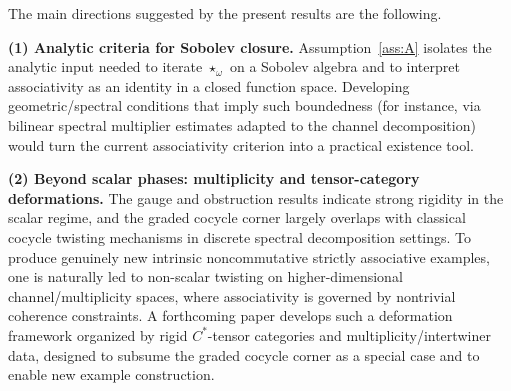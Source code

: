 \documentclass[11pt]{amsart}
\theoremstyle{plain}
\theoremstyle{definition}
\theoremstyle{remark}
\begin{document}
The main directions suggested by the present results are the following.

\medskip
\noindent\textbf{(1) Analytic criteria for Sobolev closure.}
Assumption~\ref{ass:A} isolates the analytic input needed to iterate $\star_\omega$ on a Sobolev algebra and to interpret associativity
as an identity in a closed function space.  Developing geometric/spectral conditions that imply such boundedness (for instance, via bilinear
spectral multiplier estimates adapted to the channel decomposition) would turn the current associativity criterion into a practical existence tool.

\medskip
\noindent\textbf{(2) Beyond scalar phases: multiplicity and tensor-category deformations.}
The gauge and obstruction results indicate strong rigidity in the scalar regime, and the graded cocycle corner largely overlaps with
classical cocycle twisting mechanisms in discrete spectral decomposition settings.  To produce genuinely new intrinsic noncommutative strictly associative examples,
one is naturally led to non-scalar twisting on higher-dimensional channel/multiplicity spaces, where associativity is governed by nontrivial
coherence constraints.  A forthcoming paper develops such a deformation framework organized by rigid $C^*$-tensor categories and
multiplicity/intertwiner data, designed to subsume the graded cocycle corner as a special case and to enable new example construction.




\end{document}
